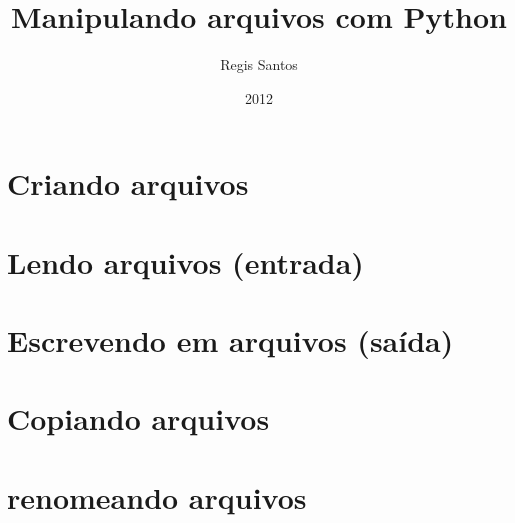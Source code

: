 \documentclass{article}
\title{Manipulando arquivos com Python}
\author{Regis Santos}
\date{2012}
\begin{document}
\maketitle

\section{Criando arquivos}



\section{Lendo arquivos (entrada)}



\section{Escrevendo em arquivos (saída)}



\section{Copiando arquivos}



\section{renomeando arquivos}
\end{document}
